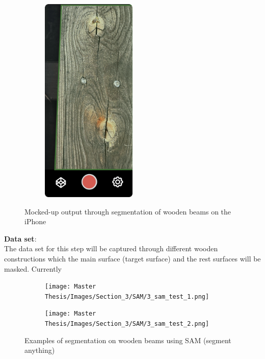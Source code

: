 \begin{figure}[ht]
\begin{subfigure}[b]{0.4\textwidth}
        \includegraphics[width=0.5\textwidth]{Master Thesis/Images/Section_3/Mock/3-Mock2.png}
    \end{subfigure}
  \caption{Mocked-up output through segmentation of wooden beams on the iPhone}   
\label{fig:mock1}
\end{figure}  

\textbf{Data set}:\\
The data set for this step will be captured through different wooden constructions which the main surface (target surface) and the rest surfaces will be masked. Currently 

\hspace*{\fill}

\begin{figure}[ht]
  \centering
    \begin{subfigure}[b]{0.3\textwidth}
      \centering
        \texttt{[image: Master Thesis/Images/Section\_3/SAM/3\_sam\_test\_1.png]}
    \end{subfigure}
    \hspace{1cm}
    \begin{subfigure}[b]{0.3\textwidth}
      \centering
        \texttt{[image: Master Thesis/Images/Section\_3/SAM/3\_sam\_test\_2.png]}
    \end{subfigure}
  \caption{Examples of segmentation on wooden beams using SAM (segment anything)}
\label{fig:sam_test}
\end{figure}

